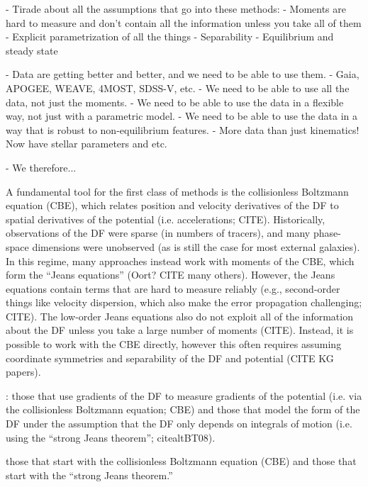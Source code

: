 - Tirade about all the assumptions that go into these methods:
  - Moments are hard to measure and don't contain all the information unless you take all of them
  - Explicit parametrization of all the things
  - Separability
  - Equilibrium and steady state

- Data are getting better and better, and we need to be able to use them.
  - Gaia, APOGEE, WEAVE, 4MOST, SDSS-V, etc.
  - We need to be able to use all the data, not just the moments.
  - We need to be able to use the data in a flexible way, not just with a parametric model.
  - We need to be able to use the data in a way that is robust to non-equilibrium features.
  - More data than just kinematics! Now have stellar parameters and etc.

- We therefore...









A fundamental tool for the first class of methods is the collisionless Boltzmann
equation (CBE), which relates position and velocity derivatives of the DF to spatial
derivatives of the potential (i.e. accelerations; CITE).
Historically, observations of the DF were sparse (in numbers of tracers), and many
phase-space dimensions were unobserved (as is still the case for most external
galaxies).
In this regime, many approaches instead work with moments of the CBE, which form the
``Jeans equations'' (Oort? CITE many others).
However, the Jeans equations contain terms that are hard to measure reliably (e.g.,
second-order things like velocity dispersion, which also make the error propagation
challenging; CITE).
The low-order Jeans equations also do not exploit all of the information about the DF
unless you take a large number of moments (CITE).
Instead, it is possible to work with the CBE directly, however this often requires
assuming coordinate symmetries and separability of the DF and potential (CITE KG
papers).




: those that use gradients of
the DF to measure gradients of the potential (i.e. via the collisionless Boltzmann
equation; CBE) and those that model the form of the DF under the assumption that the DF
only depends on integrals of motion (i.e. using the ``strong Jeans theorem'';
citealt{BT08}).

those that start with the
collisionless Boltzmann equation (CBE) and those that start with the ``strong Jeans
theorem.''

